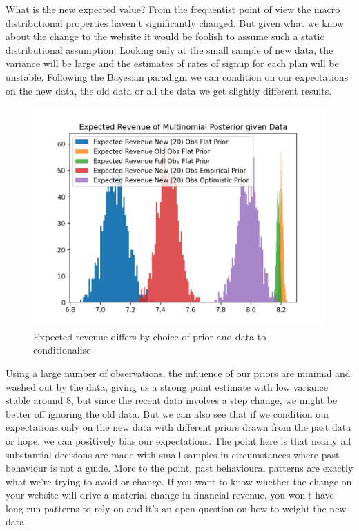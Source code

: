 \documentclass[10pt,a4paper,notitlepage, twocolumn]{article}
\begin{document}
What is the new expected value? From the frequentist point of view the macro distributional properties haven't significantly changed. But given what we know about the change to the website it would be foolish to assume such a static distributional assumption. Looking only at the small sample of new data, the variance will be large and the estimates of rates of signup for each plan will be unstable.  Following the Bayesian paradigm we can condition on our expectations on the new data, the old data or all the data we get slightly different results. 

\begin{figure}[H]
  \includegraphics[width=\linewidth]{./Plots/expected_revenue_distributions.png}
  \caption{Expected revenue differs by choice of prior and data to conditionalise}
\end{figure}

Using a large number of observations, the influence of our priors are minimal and washed out by the data, giving us a strong point estimate with low variance stable around 8, but since the recent data involves a step change, we might be better off ignoring the old data. But we can also see that if we condition our expectations only on the new data with different priors drawn from the past data or hope, we can positively bias our expectations. The point here is that nearly all substantial decisions are made with small samples in circumstances where past behaviour is not a guide. More to the point, past behavioural patterns are exactly what we're trying to avoid or change. If you want to know whether the change on your website will drive a material change in financial revenue, you won't have long run patterns to rely on and it's an open question on how to weight the new data. 
\end{document}
